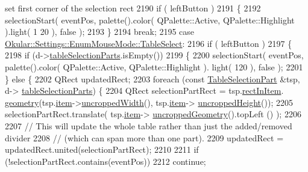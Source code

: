 \begin{DoxyCode}
{       set first corner of the selection rect}
2190              \textcolor{keywordflow}{if} ( leftButton )
2191              \{
2192                 selectionStart( eventPos, palette().color( QPalette::Active, QPalette::Highlight ).light( 1
      20 ), \textcolor{keyword}{false} );
2193              \}
2194             \textcolor{keywordflow}{break};
2195         \textcolor{keywordflow}{case} \hyperlink{classOkular_1_1Settings_1_1EnumMouseMode_ab2ae04e2d7d069f02195ccf32c52415ba5422065f9d7eff6cc08eef755e862af3}{Okular::Settings::EnumMouseMode::TableSelect}:
2196              \textcolor{keywordflow}{if} ( leftButton )
2197              \{
2198                 \textcolor{keywordflow}{if} (d->\hyperlink{classPageViewPrivate_aec476c0b74867740803d4ba34393b154}{tableSelectionParts}.isEmpty())
2199                 \{
2200                     selectionStart( eventPos, palette().color( QPalette::Active, QPalette::Highlight ).
      light( 120 ), \textcolor{keyword}{false} );
2201                 \} \textcolor{keywordflow}{else} \{
2202                     QRect updatedRect;
2203                     \textcolor{keywordflow}{foreach} (\textcolor{keyword}{const} \hyperlink{structTableSelectionPart}{TableSelectionPart} &tsp, d->
      \hyperlink{classPageViewPrivate_aec476c0b74867740803d4ba34393b154}{tableSelectionParts}) \{
2204                         QRect selectionPartRect = tsp.\hyperlink{structTableSelectionPart_ade01925b1444763cb413ad51ae7729a7}{rectInItem}.
      \hyperlink{classOkular_1_1NormalizedRect_a006897c5fcff2c3a97b4141f1a967513}{geometry}(tsp.\hyperlink{structTableSelectionPart_a400edc4e1ec30e28ff8159a741776e4b}{item}->\hyperlink{classPageViewItem_a240924407ae22bb0489363a6a2d481b9}{uncroppedWidth}(), tsp.\hyperlink{structTableSelectionPart_a400edc4e1ec30e28ff8159a741776e4b}{item}->
      \hyperlink{classPageViewItem_af1380fce5dc13a72458ef834c720b128}{uncroppedHeight}());
2205                         selectionPartRect.translate( tsp.\hyperlink{structTableSelectionPart_a400edc4e1ec30e28ff8159a741776e4b}{item}->
      \hyperlink{classPageViewItem_a5d2e73a003f65b4e95c0c21b1698f835}{uncroppedGeometry}().topLeft () );
2206 
2207                         \textcolor{comment}{// This will update the whole table rather than just the added/removed divider}
2208                         \textcolor{comment}{// (which can span more than one part).}
2209                         updatedRect = updatedRect.united(selectionPartRect);
2210 
2211                         \textcolor{keywordflow}{if} (!selectionPartRect.contains(eventPos))
2212                             \textcolor{keywordflow}{continue};

\end{DoxyCode}
